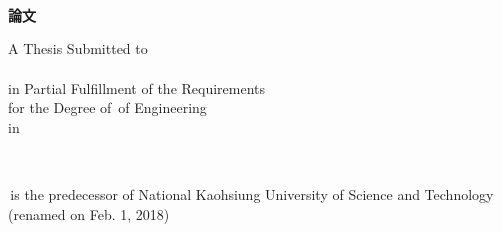 
\begin{titlepage}
\vspace*{1mm}

\begin{center}

{\LARGE\bfseries  \titletw}\\
\vspace{15mm}
{\LARGE  \titleen}
\vspace{15mm}

{\Large\bfseries{\schooltwname}\\
\vspace{4.5mm}
\Large\bfseries{}\\
\vspace{4.5mm}
\Large\bfseries \degreetw 論文}\\
\vspace{10mm}

\vspace{4.5mm}
A Thesis Submitted to \deptenname\\
\schoolenname\\
in Partial Fulfillment of the Requirements\\
for the Degree of \degreeen \,of Engineering\\
in \majortwname

\vspace{15mm}
\dateen\\
\schoolenlocation

\vspace{10mm}
\schoolenoldname \,is the predecessor of
National Kaohsiung University of
Science and Technology (renamed on Feb. 1, 2018)

\vspace{10mm}
\fontsize{14pt}{0pt}{\bfseries{\dateROC }}

\end{center}

\end{titlepage} 
